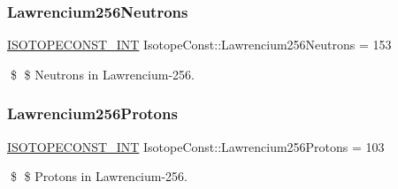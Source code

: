 \subsubsection{\texorpdfstring{Lawrencium256\+Neutrons}{Lawrencium256Neutrons}}
{\footnotesize\ttfamily \mbox{\hyperlink{group___isotope_const-_macros_ga5f18360b3e99483a35c32d789e62621c}{I\+S\+O\+T\+O\+P\+E\+C\+O\+N\+S\+T\+\_\+\+I\+NT}} Isotope\+Const\+::\+Lawrencium256\+Neutrons = 153}

\$ \$ Neutrons in Lawrencium-\/256. \mbox{\label{group___isotope_const-_lawrencium-_lr256_ga443296a1c9fd55eaa20303bb4f8632f7}} 
\subsubsection{\texorpdfstring{Lawrencium256\+Protons}{Lawrencium256Protons}}
{\footnotesize\ttfamily \mbox{\hyperlink{group___isotope_const-_macros_ga5f18360b3e99483a35c32d789e62621c}{I\+S\+O\+T\+O\+P\+E\+C\+O\+N\+S\+T\+\_\+\+I\+NT}} Isotope\+Const\+::\+Lawrencium256\+Protons = 103}

\$ \$ Protons in Lawrencium-\/256. 